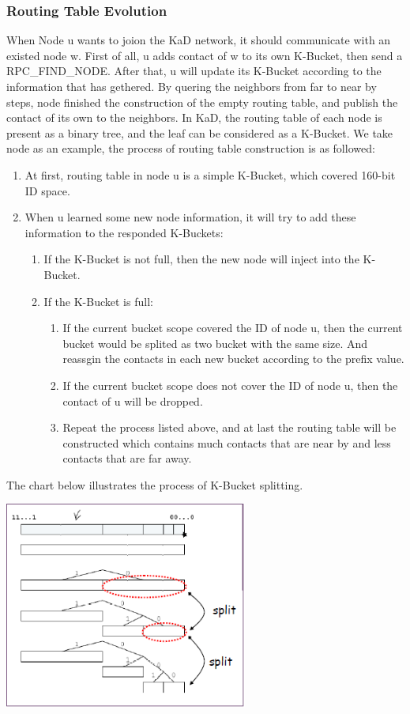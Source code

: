 \subsubsection{Routing Table Evolution}
{
When Node u wants to joion the KaD network, it should communicate with an existed node w.
First of all, u adds contact of w to its own K-Bucket, then send a RPC\_FIND\_NODE.
After that, u will update its K-Bucket according to the information that has gethered.
By quering the neighbors from far to near by steps, node finished the construction of the empty routing table, and publish the contact of its own to the neighbors.
In KaD, the routing table of each node is present as a binary tree, and the leaf can be considered as a K-Bucket.
We take node as an example, the process of routing table construction is as followed:
\begin{enumerate}
\item At first, routing table in node u is a simple K-Bucket, which covered 160-bit ID space.
\item When u learned some new node information, it will try to add these information to the responded K-Buckets:
\begin{enumerate}
\item If the K-Bucket is not full, then the new node will inject into the K-Bucket.
\item If the K-Bucket is full:
\begin{enumerate}
\item If the current bucket scope covered the ID of node u, then the current bucket would be splited as two bucket with the same size. And reassgin the contacts in each new bucket according to the prefix value.
\item If the current bucket scope does not cover the ID of node u, then the contact of u will be dropped.
\item Repeat the process listed above, and at last the routing table will be constructed which contains much contacts that are near by and less contacts that are far away.
\end{enumerate}
\end{enumerate}
\end{enumerate}
The chart below illustrates the process of K-Bucket splitting.
\begin{center}
\includegraphics[width=8cm]{data/TableSplit.png}
\end{center}

}

